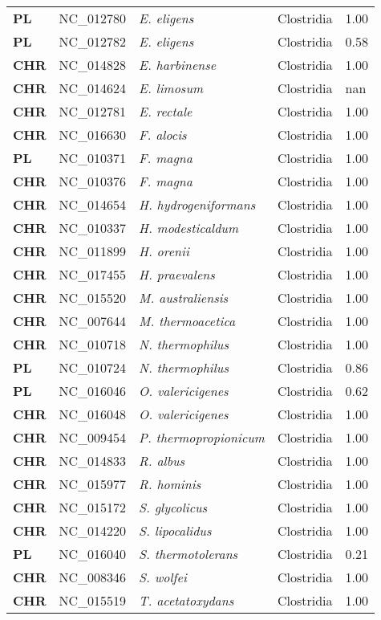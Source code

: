 \begin{adjustwidth}{-3cm}{2cm}
{\begin{supertabular}{>{\bfseries}l|p{0.1\textwidth}p{0.14\textwidth}l|l}
PL & NC\_012780 & \textit{E. eligens} & Clostridia & 1.00\\
PL & NC\_012782 & \textit{E. eligens} & Clostridia & 0.58\\
CHR & NC\_014828 & \textit{E. harbinense} & Clostridia & 1.00\\
CHR & NC\_014624 & \textit{E. limosum} & Clostridia & nan\\
CHR & NC\_012781 & \textit{E. rectale} & Clostridia & 1.00\\
CHR & NC\_016630 & \textit{F. alocis} & Clostridia & 1.00\\
PL & NC\_010371 & \textit{F. magna} & Clostridia & 1.00\\
CHR & NC\_010376 & \textit{F. magna} & Clostridia & 1.00\\
CHR & NC\_014654 & \textit{H. hydrogeniformans} & Clostridia & 1.00\\
CHR & NC\_010337 & \textit{H. modesticaldum} & Clostridia & 1.00\\
CHR & NC\_011899 & \textit{H. orenii} & Clostridia & 1.00\\
CHR & NC\_017455 & \textit{H. praevalens} & Clostridia & 1.00\\
CHR & NC\_015520 & \textit{M. australiensis} & Clostridia & 1.00\\
CHR & NC\_007644 & \textit{M. thermoacetica} & Clostridia & 1.00\\
CHR & NC\_010718 & \textit{N. thermophilus} & Clostridia & 1.00\\
PL & NC\_010724 & \textit{N. thermophilus} & Clostridia & 0.86\\
PL & NC\_016046 & \textit{O. valericigenes} & Clostridia & 0.62\\
CHR & NC\_016048 & \textit{O. valericigenes} & Clostridia & 1.00\\
CHR & NC\_009454 & \textit{P. thermopropionicum} & Clostridia & 1.00\\
CHR & NC\_014833 & \textit{R. albus} & Clostridia & 1.00\\
CHR & NC\_015977 & \textit{R. hominis} & Clostridia & 1.00\\
CHR & NC\_015172 & \textit{S. glycolicus} & Clostridia & 1.00\\
CHR & NC\_014220 & \textit{S. lipocalidus} & Clostridia & 1.00\\
PL & NC\_016040 & \textit{S. thermotolerans} & Clostridia & 0.21\\
CHR & NC\_008346 & \textit{S. wolfei} & Clostridia & 1.00\\
CHR & NC\_015519 & \textit{T. acetatoxydans} & Clostridia & 1.00\\

\end{supertabular}}
\end{adjustwidth}
